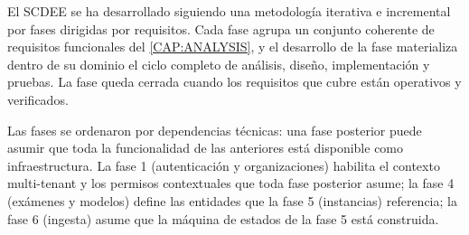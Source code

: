 El SCDEE se ha desarrollado siguiendo una metodología iterativa e
incremental por fases dirigidas por requisitos. Cada fase agrupa un
conjunto coherente de requisitos funcionales del \cref{CAP:ANALYSIS}, y
el desarrollo de la fase materializa dentro de su dominio el ciclo
completo de análisis, diseño, implementación y pruebas. La fase queda
cerrada cuando los requisitos que cubre están operativos y verificados.

Las fases se ordenaron por dependencias técnicas: una fase posterior
puede asumir que toda la funcionalidad de las anteriores está disponible
como infraestructura. La fase 1 (autenticación y organizaciones) habilita
el contexto multi-tenant y los permisos contextuales que toda fase
posterior asume; la fase 4 (exámenes y modelos) define las entidades que
la fase 5 (instancias) referencia; la fase 6 (ingesta) asume que la
máquina de estados de la fase 5 está construida.

